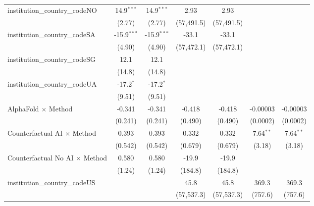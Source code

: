 \begin{tabular}{lcccccc}
   institution\_country\_codeNO          & 14.9$^{***}$  & 14.9$^{***}$  & 2.93         & 2.93         &               &   \\   
                                         & (2.77)        & (2.77)        & (57,491.5)   & (57,491.5)   &               &   \\   
   institution\_country\_codeSA          & -15.9$^{***}$ & -15.9$^{***}$ & -33.1        & -33.1        &               &   \\   
                                         & (4.90)        & (4.90)        & (57,472.1)   & (57,472.1)   &               &   \\   
   institution\_country\_codeSG          & 12.1          & 12.1          &              &              &               &   \\   
                                         & (14.8)        & (14.8)        &              &              &               &   \\   
   institution\_country\_codeUA          & -17.2$^{*}$   & -17.2$^{*}$   &              &              &               &   \\   
                                         & (9.51)        & (9.51)        &              &              &               &   \\   
   AlphaFold $\times$ Method             & -0.341        & -0.341        & -0.418       & -0.418       & -0.00003      & -0.00003\\   
                                         & (0.241)       & (0.241)       & (0.490)      & (0.490)      & (0.0002)      & (0.0002)\\   
   Counterfactual AI $\times$ Method     & 0.393         & 0.393         & 0.332        & 0.332        & 7.64$^{**}$   & 7.64$^{**}$\\   
                                         & (0.542)       & (0.542)       & (0.679)      & (0.679)      & (3.18)        & (3.18)\\   
   Counterfactual No AI $\times$ Method  & 0.580         & 0.580         & -19.9        & -19.9        &               &   \\   
                                         & (1.24)        & (1.24)        & (184.8)      & (184.8)      &               &   \\   
   institution\_country\_codeUS          &               &               & 45.8         & 45.8         & 369.3         & 369.3\\   
                                         &               &               & (57,537.3)   & (57,537.3)   & (757.6)       & (757.6)\\   

\end{tabular}
